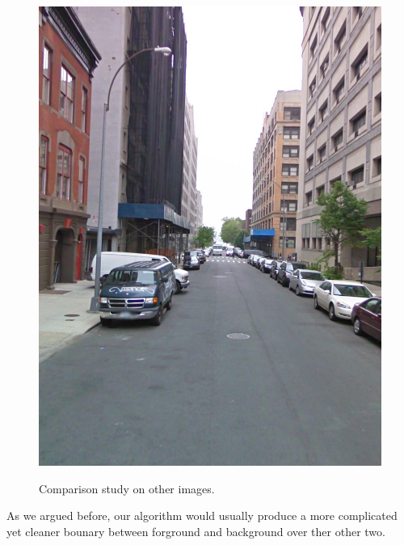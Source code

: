 \documentclass{article} %
\begin{document}
\begin{figure}[h]
\begin{center}
{\includegraphics[height=0.3\linewidth]{./fig/image_14_04.jpg}
}
\end{center}
\caption{Comparison study on other images.}
\label{fig-02_02}
\end{figure}

As we argued before, our algorithm would usually produce a more complicated yet cleaner bounary between forground and background over ther other two.



\end{document}
